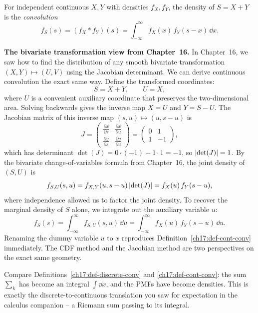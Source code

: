 \begin{definition}
\label{ch17:def-cont-conv}
For independent continuous $X,Y$ with densities $f_X,f_Y$, the density of
$S=X+Y$ is the \emph{convolution}
\[
f_S(s) = (f_X * f_Y)(s) = \int_{-\infty}^{\infty} f_X(x)\,f_Y(s-x)\,\dd x.
\]
\end{definition}

\begin{connectionbox}
\textbf{The bivariate transformation view from Chapter~16.}
In Chapter~16, we saw how to find the distribution of any smooth bivariate
transformation $(X, Y) \mapsto (U, V)$ using the Jacobian determinant. We
can derive continuous convolution the exact same way.
Define the transformed coordinates:
\[
S = X + Y, \qquad U = X,
\]
where $U$ is a convenient auxiliary coordinate that preserves the
two-dimensional area. Solving backwards gives the inverse map $X = U$ and
$Y = S - U$. The Jacobian matrix of this inverse map $(s, u) \mapsto (u, s - u)$ is
\[
J = \begin{pmatrix} \frac{\partial x}{\partial s} & \frac{\partial x}{\partial u} \\ \frac{\partial y}{\partial s} & \frac{\partial y}{\partial u} \end{pmatrix}
  = \begin{pmatrix} 0 & 1 \\ 1 & -1 \end{pmatrix},
\]
which has determinant $\det(J) = 0\cdot(-1) - 1\cdot 1 = -1$, so
$\lvert\det(J)\rvert = 1$. By the bivariate change-of-variables formula from
Chapter~16, the joint density of $(S, U)$ is
\[
f_{S,U}(s,u) = f_{X,Y}(u, s-u)\,\lvert\det(J)\rvert = f_X(u)\,f_Y(s-u),
\]
where independence allowed us to factor the joint density. To recover the
marginal density of $S$ alone, we integrate out the auxiliary variable $u$:
\[
f_S(s) = \int_{-\infty}^{\infty} f_{S,U}(s,u)\,\dd u
       = \int_{-\infty}^{\infty} f_X(u)\,f_Y(s-u)\,\dd u.
\]
Renaming the dummy variable $u$ to $x$ reproduces
Definition~\ref{ch17:def-cont-conv} immediately. The CDF method and the
Jacobian method are two perspectives on the exact same geometry.
\end{connectionbox}

\begin{connectionbox}
Compare Definitions~\ref{ch17:def-discrete-conv} and
\ref{ch17:def-cont-conv}: the sum $\sum_k$ has become an integral
$\int \dd x$, and the PMFs have become densities. This is exactly the
discrete-to-continuous translation you saw for expectation in the calculus
companion -- a Riemann sum passing to its integral.
\end{connectionbox}

